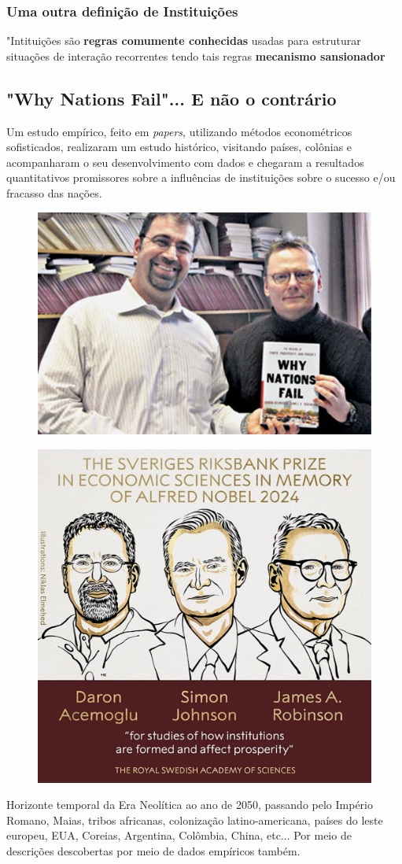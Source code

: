 \documentclass[a4paper,12pt]{article}[abntex2]
\begin{document}
\subsubsection{\textbf{Uma outra definição de Instituições}}
"Intituições são \textbf{regras comumente conhecidas} usadas para estruturar situações de interação recorrentes tendo tais regras \textbf{mecanismo sansionador}

\subsection{\textbf{"Why Nations Fail"... E não o contrário}}
Um estudo empírico, feito em \textit{papers}, utilizando métodos econométricos sofisticados, realizaram um estudo histórico, visitando países, colônias e acompanharam o seu desenvolvimento com dados e chegaram a resultados quantitativos promissores sobre a influências de instituições sobre o sucesso e/ou fracasso das nações. 

\begin{figure}[H]
    \centering
    \includegraphics[width=0.5\linewidth]{Imagens/a2i2.png}
\end{figure}

\begin{figure}[H]
    \centering
    \includegraphics[width=0.5\linewidth]{Imagens/a2i3.png}
\end{figure}

Horizonte temporal da Era Neolítica ao ano de 2050, passando pelo Império Romano, Maias, tribos africanas, colonização latino-americana, países do leste europeu, EUA, Coreias, Argentina, Colômbia, China, etc... Por meio de descrições descobertas por meio de dados empíricos também.
\end{document}
